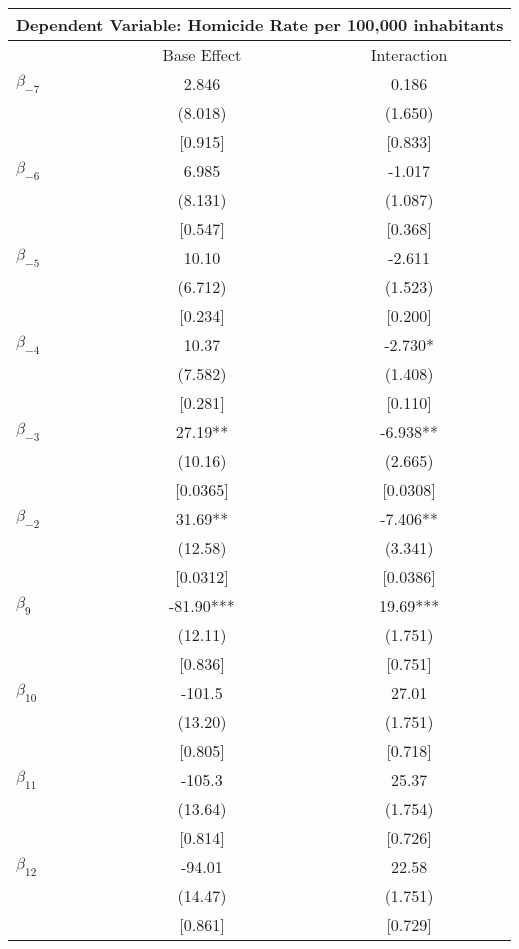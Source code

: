 \documentclass[12pt]{article}
\begin{document}
\begin{table}[H]
\small
\begin{threeparttable}
\begin{tabular}{l@{\hspace{2em}}c@{\hspace{2em}}c}
\toprule
\multicolumn{3}{c}{Dependent Variable: Homicide Rate per 100,000 inhabitants} \\
\midrule
 & Base Effect & Interaction \\
\midrule
$\beta_{-7}$ & 2.846 & 0.186 \\
 & (8.018) & (1.650) \\
 & [0.915] & [0.833] \\[0.5em]
$\beta_{-6}$ & 6.985 & -1.017 \\
 & (8.131) & (1.087) \\
 & [0.547] & [0.368] \\[0.5em]
$\beta_{-5}$ & 10.10 & -2.611 \\
 & (6.712) & (1.523) \\
 & [0.234] & [0.200] \\[0.5em]
$\beta_{-4}$ & 10.37 & -2.730* \\
 & (7.582) & (1.408) \\
 & [0.281] & [0.110] \\[0.5em]
$\beta_{-3}$ & 27.19** & -6.938** \\
 & (10.16) & (2.665) \\
 & [0.0365] & [0.0308] \\[0.5em]
$\beta_{-2}$ & 31.69** & -7.406** \\
 & (12.58) & (3.341) \\
 & [0.0312] & [0.0386] \\[0.5em]
$\beta_{9}$ & -81.90*** & 19.69*** \\
 & (12.11) & (1.751) \\
 & [0.836] & [0.751] \\[0.5em]
$\beta_{10}$ & -101.5 & 27.01 \\
 & (13.20) & (1.751) \\
 & [0.805] & [0.718] \\[0.5em]
$\beta_{11}$ & -105.3 & 25.37 \\
 & (13.64) & (1.754) \\
 & [0.814] & [0.726] \\[0.5em]
$\beta_{12}$ & -94.01 & 22.58 \\
 & (14.47) & (1.751) \\
 & [0.861] & [0.729] \\

\end{tabular}
\end{threeparttable}
\end{table}
\end{document}
